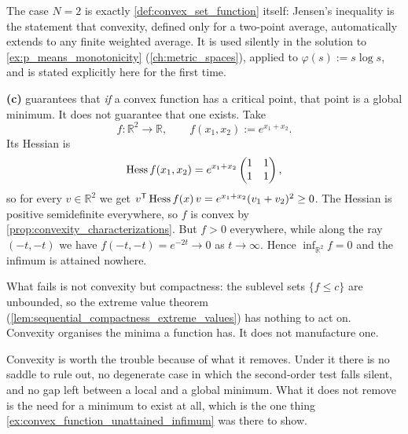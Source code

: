 \begin{remark}
The case $N=2$ is exactly \cref{def:convex_set_function} itself: Jensen's inequality is the
statement that convexity, defined only for a two-point average, automatically extends to any
finite weighted average. It is used silently in the solution to \cref{ex:p_means_monotonicity}
(\cref{ch:metric_spaces}), applied to $\varphi(s):=s\log s$, and is stated explicitly here for
the first time.
\end{remark}

\begin{example}
\label{ex:convex_function_unattained_infimum}
\textbf{(c)} guarantees that \emph{if} a convex function has
a critical point, that point is a global minimum. It does not guarantee that one exists. Take
\[f : \mathbb{R}^2 \to \mathbb{R}, \qquad f(x_1,x_2) := e^{x_1+x_2}.\]
Its Hessian is
\[\operatorname{Hess} f(x_1,x_2) = e^{x_1+x_2}\begin{pmatrix} 1 & 1 \\ 1 & 1\end{pmatrix},\]
so for every $v \in \mathbb{R}^2$ we get
$v^{\mathsf{T}}\operatorname{Hess} f(x)\,v = e^{x_1+x_2}(v_1+v_2)^2 \geq 0$. The Hessian is positive semidefinite
everywhere, so $f$ is convex by \cref{prop:convexity_characterizations}. But $f > 0$ everywhere,
while along the ray $(-t,-t)$ we have $f(-t,-t) = e^{-2t} \to 0$ as $t \to \infty$. Hence
$\inf_{\mathbb{R}^2}f = 0$ and the infimum is attained nowhere.

What fails is not convexity but compactness: the sublevel sets $\{f \leq c\}$ are unbounded, so
the extreme value theorem (\cref{lem:sequential_compactness_extreme_values}) has nothing to act
on. Convexity organises the minima a function has. It does not manufacture one.
\end{example}

Convexity is worth the trouble because of what it removes. Under it there is no saddle to rule
out, no degenerate case in which the second-order test falls silent, and no gap left between a
local and a global minimum. What it does not remove is the need for a minimum to exist at all,
which is the one thing \cref{ex:convex_function_unattained_infimum} was there to show.


